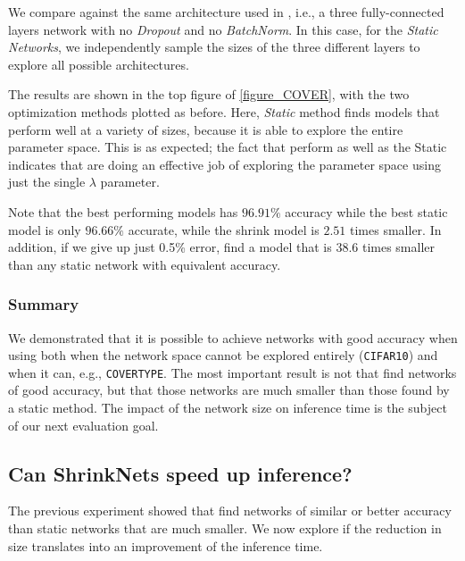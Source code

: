We compare \shrink against the same architecture
used in \cite{Scardapane2017}, i.e., a three fully-connected layers network with no
\textit{Dropout} \cite{Srivastava2014} and no \textit{BatchNorm}. 
In this case, for the \textit{Static Networks}, we independently sample the
sizes of the three different layers to explore all possible architectures.

The results are shown in the top figure of \cref{figure_COVER}, with the two
optimization methods plotted as before. Here, {\it Static} method finds models
that perform well at a variety of sizes, because it is able to explore the
entire parameter space.  This is as expected;  the fact that \shrink perform
as well as the Static indicates that \shrink are doing an effective job of
exploring the parameter space using just the single $\lambda$ parameter.

Note that the best performing \shrink models has $96.91\%$ accuracy while the
best static model is only $96.66\%$ accurate, while the \shrink shrink model is $2.51$
times smaller. In addition, if we give up just 0.5\% error, \shrink find a
model that is 38.6 times smaller than any static network with equivalent accuracy.


\subsubsection{Summary}

We  demonstrated that it is possible to achieve networks with good accuracy
when using \shrink both when the network space cannot be explored entirely
(\texttt{CIFAR10}) and when it can, e.g., \texttt{COVERTYPE}. The most important
result is not that \shrink find networks of good accuracy, but that those
networks are much smaller than those found by a static method. The impact of the
network size on inference time is the subject of our next evaluation goal.


\subsection{Can ShrinkNets speed up inference?}

The previous experiment showed that \shrink find networks of similar or better accuracy
than static networks that are much smaller. We now explore if the reduction in size
translates into an improvement of the inference time.

